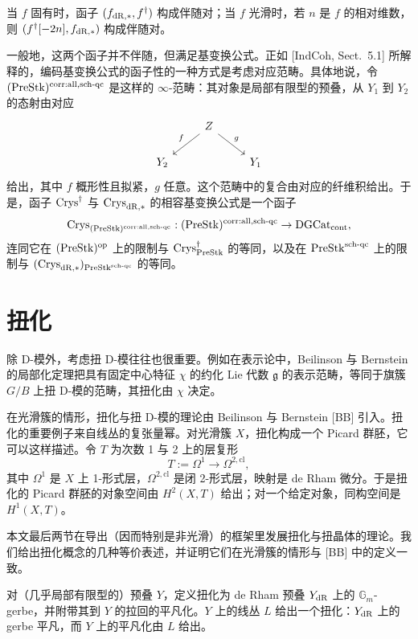 当 $f$ 固有时，函子 $(f_{\mathrm{dR},*},f^\dagger)$ 构成伴随对；当 $f$ 光滑时，若 $n$ 是 $f$ 的相对维数，则 $(f^\dagger[-2n],f_{\mathrm{dR},*})$ 构成伴随对。

一般地，这两个函子并不伴随，但满足基变换公式。正如 [IndCoh, Sect.~5.1] 所解释的，编码基变换公式的函子性的一种方式是考虑对应范畴。具体地说，令 $(\mathrm{PreStk})^{\mathrm{corr:all,sch\text{-}qc}}$ 是这样的 $\infty$-范畴：其对象是局部有限型的预叠，从 $Y_1$ 到 $Y_2$ 的态射由对应
\[
\begin{tikzcd}
 & Z \arrow[dl, "f"'] \arrow[dr, "g"] & \\
 Y_2 & & Y_1
\end{tikzcd}
\]
给出，其中 $f$ 概形性且拟紧，$g$ 任意。这个范畴中的复合由对应的纤维积给出。于是，函子 $\mathrm{Crys}^\dagger$ 与 $\mathrm{Crys}_{\mathrm{dR},*}$ 的相容基变换公式是一个函子
\[
\mathrm{Crys}_{(\mathrm{PreStk})^{\mathrm{corr:all,sch\text{-}qc}}}:(\mathrm{PreStk})^{\mathrm{corr:all,sch\text{-}qc}}\to\mathrm{DGCat}_{\mathrm{cont}},
\]
连同它在 $(\mathrm{PreStk})^{\mathrm{op}}$ 上的限制与 $\mathrm{Crys}^\dagger_{\mathrm{PreStk}}$ 的等同，以及在 $\mathrm{PreStk}^{\mathrm{sch\text{-}qc}}$ 上的限制与 $(\mathrm{Crys}_{\mathrm{dR},*})_{\mathrm{PreStk}^{\mathrm{sch\text{-}qc}}}$ 的等同。

\section{扭化}

除 D-模外，考虑扭 D-模往往也很重要。例如在表示论中，Beilinson 与 Bernstein 的局部化定理把具有固定中心特征 $\chi$ 的约化 Lie 代数 $\mathfrak{g}$ 的表示范畴，等同于旗簇 $G/B$ 上扭 D-模的范畴，其扭化由 $\chi$ 决定。

在光滑簇的情形，扭化与扭 D-模的理论由 Beilinson 与 Bernstein [BB] 引入。扭化的重要例子来自线丛的复张量幂。对光滑簇 $X$，扭化构成一个 Picard 群胚，它可以这样描述。令 $T$ 为次数 1 与 2 上的层复形
\[
T:=\Omega^1\to\Omega^{2,\mathrm{cl}},
\]
其中 $\Omega^1$ 是 $X$ 上 1-形式层，$\Omega^{2,\mathrm{cl}}$ 是闭 2-形式层，映射是 de Rham 微分。于是扭化的 Picard 群胚的对象空间由 $H^2(X,T)$ 给出；对一个给定对象，同构空间是 $H^1(X,T)$。

本文最后两节在导出（因而特别是非光滑）的框架里发展扭化与扭晶体的理论。我们给出扭化概念的几种等价表述，并证明它们在光滑簇的情形与 [BB] 中的定义一致。

对（几乎局部有限型的）预叠 $Y$，定义扭化为 de Rham 预叠 $Y_{\mathrm{dR}}$ 上的 $\mathbb{G}_m$-gerbe，并附带其到 $Y$ 的拉回的平凡化。$Y$ 上的线丛 $L$ 给出一个扭化：$Y_{\mathrm{dR}}$ 上的 gerbe 平凡，而 $Y$ 上的平凡化由 $L$ 给出。

